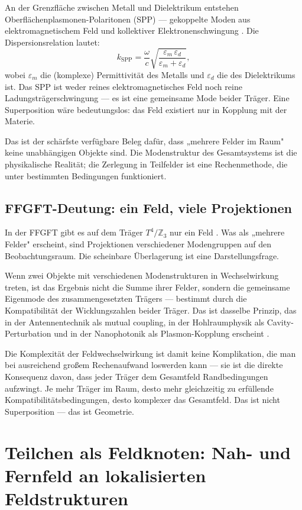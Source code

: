 An der Grenzfläche zwischen Metall und Dielektrikum entstehen
Oberflächenplasmonen-Polaritonen (SPP) --- gekoppelte Moden aus
elektromagnetischem Feld und kollektiver Elektronenschwingung \cite{Maier2007}.
Die Dispersionsrelation lautet:
\[
  k_\mathrm{SPP} = \frac{\omega}{c}\sqrt{\frac{\varepsilon_m\,\varepsilon_d}
    {\varepsilon_m + \varepsilon_d}},
\]
wobei $\varepsilon_m$ die (komplexe) Permittivität des Metalls und
$\varepsilon_d$ die des Dielektrikums ist. Das SPP ist weder reines
elektromagnetisches Feld noch reine Ladungsträgerschwingung --- es ist
eine gemeinsame Mode beider Träger. Eine Superposition wäre
bedeutungslos: das Feld existiert nur in Kopplung mit der Materie.

Das ist der schärfste verfügbare Beleg dafür, dass „mehrere Felder
im Raum" keine unabhängigen Objekte sind. Die Modenstruktur des
Gesamtsystems ist die physikalische Realität; die Zerlegung in
Teilfelder ist eine Rechenmethode, die unter bestimmten Bedingungen
funktioniert.

\subsection*{FFGFT-Deutung: ein Feld, viele Projektionen}

In der FFGFT gibt es auf dem Träger $T^4/\mathbb{Z}_3$ nur ein Feld
\SetzM. Was als „mehrere Felder" erscheint, sind Projektionen
verschiedener Modengruppen auf den Beobachtungsraum. Die scheinbare
Überlagerung ist eine Darstellungsfrage.

Wenn zwei Objekte mit verschiedenen Modenstrukturen in Wechselwirkung
treten, ist das Ergebnis nicht die Summe ihrer Felder, sondern die
gemeinsame Eigenmode des zusammengesetzten Trägers --- bestimmt durch
die Kompatibilität der Wicklungszahlen beider Träger. Das ist dasselbe
Prinzip, das in der Antennentechnik als mutual coupling, in der
Hohlraumphysik als Cavity-Perturbation und in der Nanophotonik als
Plasmon-Kopplung erscheint \SM.

Die Komplexität der Feldwechselwirkung ist damit keine Komplikation,
die man bei ausreichend großem Rechenaufwand loswerden kann --- sie ist
die direkte Konsequenz davon, dass jeder Träger dem Gesamtfeld
Randbedingungen aufzwingt. Je mehr Träger im Raum, desto mehr
gleichzeitig zu erfüllende Kompatibilitätsbedingungen, desto
komplexer das Gesamtfeld. Das ist nicht Superposition --- das ist
Geometrie.

\section{Teilchen als Feldknoten: Nah- und Fernfeld an lokalisierten Feldstrukturen}

